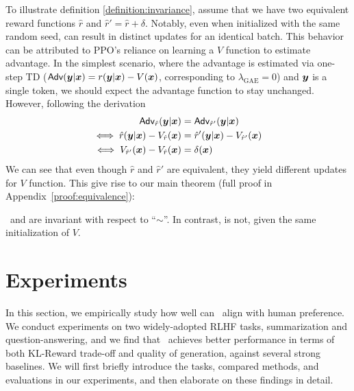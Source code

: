\documentclass{article} %
\newcommand{\algn}{\text{P3O}}
\begin{document}
To illustrate definition \ref{definition:invariance}, assume that we have two equivalent reward functions $\hat{r}$ and $\hat{r}'=\hat{r}+\delta$. Notably, even when initialized with the same random seed,  can result in distinct updates for an identical batch. This behavior can be attributed to PPO's reliance on learning a $V$ function to estimate advantage.
In the simplest scenario, where the advantage is estimated via one-step TD ($\textsf{Adv}({\bm{y}}|{\bm{x}})=r({\bm{y}}|{\bm{x}})-V({\bm{x}})$, corresponding to $\lambda_{\text{GAE}}=0$) and ${\bm{y}}$ is a single token, we should expect the advantage function to stay unchanged. However, following the derivation
\begin{align*}
    \textsf{Adv}_{\hat{r}}({\bm{y}}|{\bm{x}})&=\textsf{Adv}_{\hat{r}'}({\bm{y}}|{\bm{x}})\\
    \iff  \hat{r}({\bm{y}}|{\bm{x}}) - V_{\hat{r}}({\bm{x}}) &= \hat{r}'({\bm{y}}|{\bm{x}}) - V_{\hat{r}'}({\bm{x}})\\
    \iff V_{\hat{r}'}({\bm{x}})-V_{\hat{r}}({\bm{x}}) &= \delta({\bm{x}})
\end{align*}
We can see that even though $\hat{r}$ and $\hat{r}'$ are equivalent, they yield different updates for $V$ function. This give rise to our main theorem (full proof in Appendix~\ref{proof:equivalence}):
\begin{theorem}
    \algn\ and  are invariant with respect to ``$\sim$''. In contrast,  is not, given the same initialization of $V$. \label{theorem:invariance}
\end{theorem}

\section{Experiments}
In this section, we empirically study how well can \algn\ align with human preference. 
We conduct experiments on two widely-adopted RLHF tasks, summarization and question-answering, and we find that \algn\ achieves better performance in terms of both KL-Reward trade-off and quality of generation, against several strong baselines. 
We will first briefly introduce the tasks, compared methods, and evaluations in our experiments, and then elaborate on these findings in detail.
\end{document}
